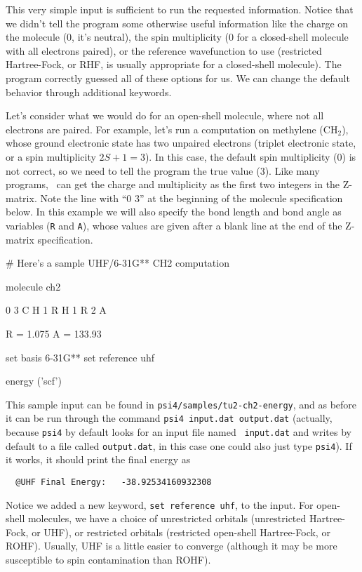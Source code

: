 This very simple input is sufficient to run the requested information.
Notice that we didn't tell the program some otherwise useful information
like the charge on the molecule (0, it's neutral), the spin multiplicity
(0 for a closed-shell molecule with all electrons paired), or the reference
wavefunction to use (restricted Hartree-Fock, or RHF, is usually
appropriate for a closed-shell molecule).  The program correctly guessed
all of these options for us.  We can change the default behavior through
additional keywords.  

Let's consider what we would do for an open-shell molecule, where
not all electrons are paired.  For example, let's run a computation
on methylene (CH$_2$), whose ground electronic state has two unpaired
electrons (triplet electronic state, or a spin multiplicity $2S+1 = 3$).
In this case, the default spin multiplicity (0) is not correct, so we
need to tell the program the true value (3).  Like many programs, \PSIfour\
can get the charge and multiplicity as the first two integers in the
Z-matrix.  Note the line with ``0 3'' at the beginning of the molecule
specification below.  In this example we will also specify the bond length
and bond angle as variables ({\tt R} and {\tt A}), whose values are given
after a blank line at the end of the Z-matrix specification.

\begin{Snippet}
# Here's a sample UHF/6-31G** CH2 computation

molecule ch2 {
  0 3
  C
  H 1 R
  H 1 R 2 A

  R = 1.075
  A = 133.93
}

set basis 6-31G**
set reference uhf

energy ('scf')
\end{Snippet}

This sample input can be found in {\tt psi4/samples/tu2-ch2-energy}, and as
before it can be run through the command {\tt psi4 input.dat output.dat}
(actually, because {\tt psi4} by default looks for an input file named {\tt
input.dat} and writes by default to a file called {\tt output.dat}, in this
case one could also just type {\tt psi4}).  If it works, it should print
the final energy as
\begin{verbatim}
  @UHF Final Energy:   -38.92534160932308
\end{verbatim}
Notice we added a new keyword, {\tt set reference uhf}, to the input.  For
open-shell molecules, we have a choice of unrestricted orbitals
(unrestricted Hartree-Fock, or UHF), or restricted orbitals (restricted
open-shell Hartree-Fock, or ROHF).  Usually, UHF is a little easier to
converge (although it may be more susceptible to spin contamination than
ROHF).

